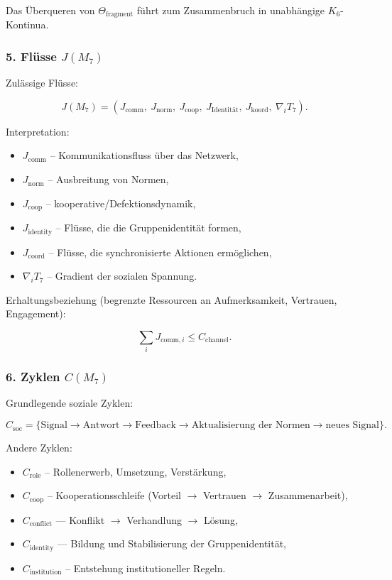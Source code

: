 Das Überqueren von $\Theta_{\mathrm{fragment}}$ führt zum Zusammenbruch in unabhängige $K_6$-Kontinua.

\subsubsection*{5. Flüsse \texorpdfstring{$J(M_7)$}{J(M_7)}}

Zulässige Flüsse:

\[
J(M_7)=
\left(
J_{\mathrm{comm}},\
J_{\mathrm{norm}},\
J_{\mathrm{coop}},\
J_{\mathrm{Identität}},\
J_{\mathrm{koord}},\
\nabla_i T_7
\right).
\]

Interpretation:

\begin{itemize}
    \item $J_{\mathrm{comm}}$ – Kommunikationsfluss über das Netzwerk,
    \item $J_{\mathrm{norm}}$ – Ausbreitung von Normen,
    \item $J_{\mathrm{coop}}$ – kooperative/Defektionsdynamik,
    \item $J_{\mathrm{identity}}$ – Flüsse, die die Gruppenidentität formen,
    \item $J_{\mathrm{coord}}$ – Flüsse, die synchronisierte Aktionen ermöglichen,
    \item $\nabla_i T_7$ – Gradient der sozialen Spannung.
\end{itemize}

Erhaltungsbeziehung (begrenzte Ressourcen an Aufmerksamkeit, Vertrauen, Engagement):

\[
\sum_i J_{\mathrm{comm},i} \le C_{\mathrm{channel}}.
\]

\subsubsection*{6. Zyklen \texorpdfstring{$C(M_7)$}{C(M_7)}}

Grundlegende soziale Zyklen:

\[
C_{\mathrm{soc}} =
\{
\text{Signal} \to \text{Antwort} \to \text{Feedback} \to
\text{Aktualisierung der Normen} \to \text{neues Signal}
\}.
\]

Andere Zyklen:

\begin{itemize}
    \item $C_{\mathrm{role}}$ – Rollenerwerb, Umsetzung, Verstärkung,
    \item $C_{\mathrm{coop}}$ – Kooperationsschleife (Vorteil $\to$ Vertrauen $\to$ Zusammenarbeit),
    \item $C_{\mathrm{conflict}}$ — Konflikt $\to$ Verhandlung $\to$ Lösung,
    \item $C_{\mathrm{identity}}$ — Bildung und Stabilisierung der Gruppenidentität,
    \item $C_{\mathrm{institution}}$ – Entstehung institutioneller Regeln.
\end{itemize}

